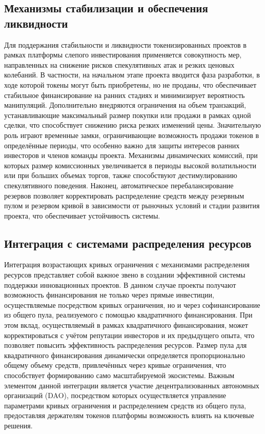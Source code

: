 \documentclass[
    candidate, %
    subf, %
    dotsinheaders=false,
]{disser}
\begin{document}
  \subsection{Механизмы стабилизации и обеспечения ликвидности}

  Для поддержания стабильности и ликвидности токенизированных проектов в рамках платформы слепого инвестирования применяется совокупность мер, направленных на снижение рисков спекулятивных атак и резких ценовых колебаний. В частности, на начальном этапе проекта вводится фаза разработки, в ходе которой токены могут быть приобретены, но не проданы, что обеспечивает стабильное финансирование на ранних стадиях и минимизирует вероятность манипуляций. Дополнительно внедряются ограничения на объем транзакций, устанавливающие максимальный размер покупки или продажи в рамках одной сделки, что способствует снижению риска резких изменений цены. Значительную роль играют временные замки, ограничивающие возможность продажи токенов в определённые периоды, что особенно важно для защиты интересов ранних инвесторов и членов команды проекта. Механизмы динамических комиссий, при которых размер комиссионных увеличивается в периоды высокой волатильности или при больших объемах торгов, также способствуют дестимулированию спекулятивного поведения. Наконец, автоматическое перебалансирование резервов позволяет корректировать распределение средств между резервным пулом и резервом кривой в зависимости от рыночных условий и стадии развития проекта, что обеспечивает устойчивость системы.

  \subsection{Интеграция с системами распределения ресурсов}

  Интеграция возрастающих кривых ограничения с механизмами распределения ресурсов представляет собой важное звено в создании эффективной системы поддержки инновационных проектов. В данном случае проекты получают возможность финансирования не только через прямые инвестиции, осуществляемые посредством кривых ограничения, но и через софинансирование из общего пула, реализуемого с помощью квадратичного финансирования. При этом вклад, осуществляемый в рамках квадратичного финансирования, может корректироваться с учётом репутации инвесторов и их предыдущего опыта, что позволяет повысить эффективность распределения ресурсов. Размер пула для квадратичного финансирования динамически определяется пропорционально общему объему средств, привлечённых через кривые ограничения, что способствует формированию само масштабируемой экосистемы. Важным элементом данной интеграции является участие децентрализованных автономных организаций (DAO), посредством которых осуществляется управление параметрами кривых ограничения и распределением средств из общего пула, предоставляя держателям токенов платформы возможность влиять на ключевые решения.
\end{document}
